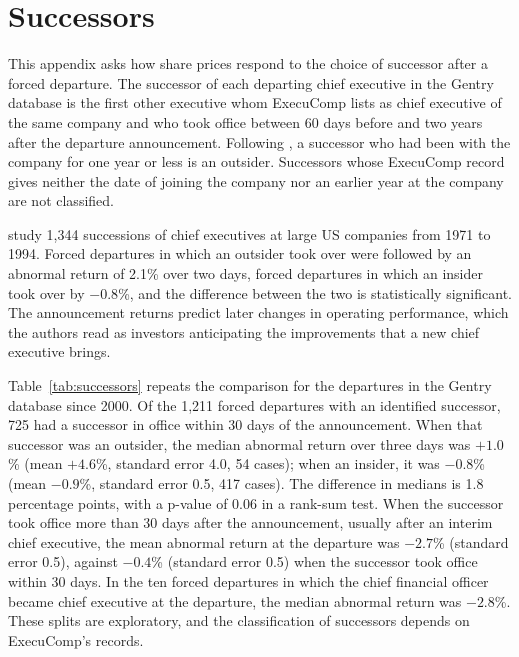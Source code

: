 \documentclass[11pt,a4paper]{article}
\begin{document}
\section{Successors}\label{app:successors}

This appendix asks how share prices respond to the choice of successor after a forced departure. The successor of each departing chief executive in the Gentry database is the first other executive whom ExecuComp lists as chief executive of the same company and who took office between 60 days before and two years after the departure announcement. Following \citet{huson2004}, a successor who had been with the company for one year or less is an outsider. Successors whose ExecuComp record gives neither the date of joining the company nor an earlier year at the company are not classified.

\citet{huson2004} study 1,344 successions of chief executives at large US companies from 1971 to 1994. Forced departures in which an outsider took over were followed by an abnormal return of 2.1\% over two days, forced departures in which an insider took over by $-0.8$\%, and the difference between the two is statistically significant. The announcement returns predict later changes in operating performance, which the authors read as investors anticipating the improvements that a new chief executive brings.

Table~\ref{tab:successors} repeats the comparison for the departures in the Gentry database since 2000. Of the 1,211 forced departures with an identified successor, 725 had a successor in office within 30 days of the announcement. When that successor was an outsider, the median abnormal return over three days was $+1.0$\% (mean $+4.6$\%, standard error 4.0, 54 cases); when an insider, it was $-0.8$\% (mean $-0.9$\%, standard error 0.5, 417 cases). The difference in medians is 1.8 percentage points, with a p-value of 0.06 in a rank-sum test. When the successor took office more than 30 days after the announcement, usually after an interim chief executive, the mean abnormal return at the departure was $-2.7$\% (standard error 0.5), against $-0.4$\% (standard error 0.5) when the successor took office within 30 days. In the ten forced departures in which the chief financial officer became chief executive at the departure, the median abnormal return was $-2.8$\%. These splits are exploratory, and the classification of successors depends on ExecuComp's records.
\end{document}
